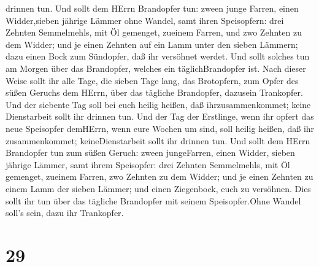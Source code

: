 drinnen tun.  Und sollt dem HErrn Brandopfer tun: zween
junge Farren, einen Widder,sieben jährige Lämmer ohne Wandel,
 samt ihren Speisopfern: drei Zehnten Semmelmehls, mit Öl
gemenget, zueinem Farren, und zwo Zehnten zu dem Widder; 
und je einen Zehnten auf ein Lamm unter den sieben Lämmern;
 dazu einen Bock zum Sündopfer, daß ihr versöhnet werdet.
 Und sollt solches tun am Morgen über das Brandopfer,
welches ein täglichBrandopfer ist.  Nach dieser Weise sollt
ihr alle Tage, die sieben Tage lang, das Brotopfern, zum Opfer des süßen
Geruchs dem HErrn, über das tägliche Brandopfer, dazusein Trankopfer.
 Und der siebente Tag soll bei euch heilig heißen, daß
ihrzusammenkommet; keine Dienstarbeit sollt ihr drinnen tun.
 Und der Tag der Erstlinge, wenn ihr opfert das neue
Speisopfer demHErrn, wenn eure Wochen um sind, soll heilig heißen, daß
ihr zusammenkommet; keineDienstarbeit sollt ihr drinnen tun.
 Und sollt dem HErrn Brandopfer tun zum süßen Geruch: zween
jungeFarren, einen Widder, sieben jährige Lämmer,  samt
ihrem Speisopfer: drei Zehnten Semmelmehls, mit Öl gemenget, zueinem
Farren, zwo Zehnten zu dem Widder;  und je einen Zehnten zu
einem Lamm der sieben Lämmer;  und einen Ziegenbock, euch
zu versöhnen.  Dies sollt ihr tun über das tägliche
Brandopfer mit seinem Speisopfer.Ohne Wandel soll's sein, dazu ihr
Trankopfer.

\hypertarget{section-28}{%
\section{29}\label{section-28}}

